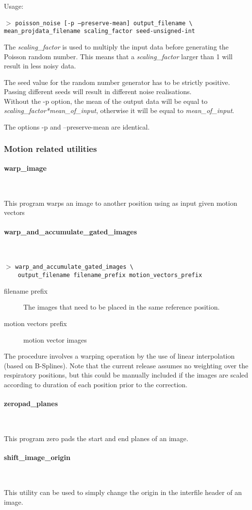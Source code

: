 \documentclass{article}
\newcommand{\subsubsubsection}[1]{\paragraph{#1}\mbox{} \\}
\newcommand{\cmdline}[1]{\par \noindent $>$ \texttt{#1}\par}
\begin{document}
{{Usage:
\cmdline{poisson\_noise [-p {\textbar} --preserve-mean] output\_filename 
{\textbackslash}\\
mean\_projdata\_filename scaling\_factor seed-unsigned-int}


The \textit{scaling\_factor} is used to multiply the input data before 
generating the Poisson random number. This means that a \textit{scaling\_factor} 
larger than 1 will result in less noisy data.


The seed value for the random number generator has to be strictly 
positive. Passing different seeds will result in different noise 
realisations.\\
Without the -p option, the mean of the output data will be equal 
to \textit{scaling\_factor*mean\_of\_input}, otherwise it will be equal 
to \textit{mean\_of\_input}.


The options -p and --preserve-mean are identical.


\subsubsection{Motion related utilities}
\label{sec:motionRelatedUtilities}
{ \subsubsubsection{warp\_image}
}
This program warps an image to another position using as input given motion vectors 

{ \subsubsubsection{warp\_and\_accumulate\_gated\_images}
}
\cmdline{warp\_and\_accumulate\_gated\_images \textbackslash \\
\,\,\,\,output\_filename filename\_prefix motion\_vectors\_prefix}

\begin{description}
\item[filename prefix] The images that need to be placed in the
same reference position.

\item[motion vectors prefix]  motion vector images
\end{description}

The
procedure involves a warping operation by the use of linear interpolation (based
on B-Splines). Note that the current release assumes no weighting over the
respiratory positions, but this could be manually included if the images are
scaled according to duration of each position prior to the correction.


{ \subsubsubsection{zeropad\_planes}
}
This program zero pads the start and end planes of an image. 

{ \subsubsubsection{shift\_image\_origin}
}
This utility can be used to simply
change the origin in the interfile header of an image. 

}}
\end{document}
